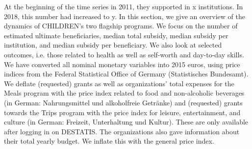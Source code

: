 \documentclass[12pt, a4paper, titlepage]{article}\usepackage[]{graphicx}\usepackage[]{color}
\begin{document}

At the beginning of the time series in 2011, they supported in x institutions. In 2018, this number had increased to y. In this section, we give an overview of the dynamics of CHILDREN's two flagship programs. We focus on the number of estimated ultimate beneficiaries, median total subsidy, median subsidy per institution, and median subsidy per beneficiary. We also look at selected outcomes, i.e. those related to health as well as self-worth and day-to-day skills. We have converted all nominal monetary variables into 2015 euros, using price indices from the Federal Statistical Office of Germany (Statistisches Bundesamt). We deflate (requested) grants as well as organizations' total expenses for the Meals program  with the price index related to food and non-alcoholic beverages (in German: Nahrungsmittel und alkoholfreie Getränke) and (requested) grants towards the Trips program with the price index for leisure, entertainment, and culture (in German: Freizeit, Unterhaltung und Kultur). These are only available after logging in on DESTATIS. The organizations also gave information about their total yearly budget. We inflate this with the general price index.    
\end{document}
